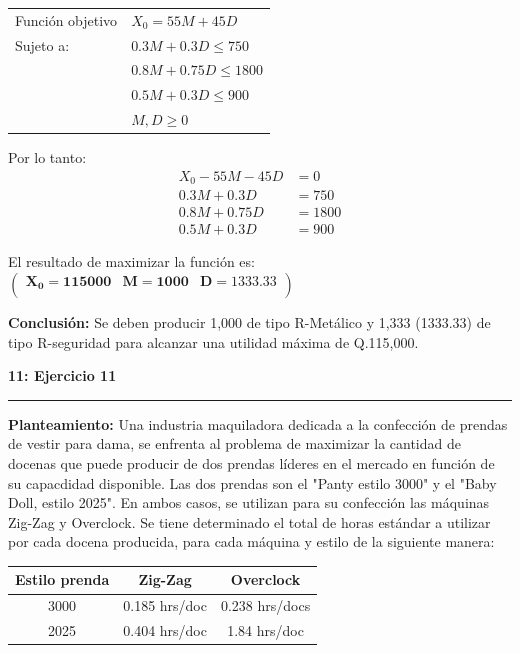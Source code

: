 \documentclass[11pt]{article}
\newcommand\problema[2]{\vspace{.01in}\textbf{#1: #2}\vspace{.5em}\hrule\vspace{.10in}}
\newcommand\planteamiento{\vspace{.10in}\textbf{Planteamiento: }}
\newcommand\conclusion{\vspace{.10in}\textbf{Conclusión: }}
\begin{document}
\begin{table}[h]
\begin{tabular}{ll}
Función objetivo & $X_0 = 55M+45D$    \\
Sujeto a:        & $0.3M + 0.3D \leq 750$ \\
                 & $0.8M + 0.75D \leq 1800$ \\
                 & $0.5M + 0.3D \leq 900$ \\
                 & $M,D \geq 0$    
\end{tabular}
\end{table}

Por lo tanto:
\begin{align*}
X_0 - 55M - 45D &= 0\\
0.3M + 0.3D &= 750\\
0.8M + 0.75D &= 1800\\
0.5M + 0.3D &= 900
\end{align*}

El resultado de maximizar la función es:
\begin{math}
\mathbf{\left(\begin{array}{rrr}X_0=115000&M=1000&D=1333.33\\\end{array}\right)}
\end{math}

\conclusion Se deben producir 1,000 de tipo R-Metálico y 1,333 (1333.33) de tipo R-seguridad para alcanzar una utilidad máxima de Q.115,000.

\pagebreak
\problema{11}{Ejercicio 11}
\planteamiento
Una industria maquiladora dedicada a la confección de prendas de vestir para dama, se enfrenta al problema de maximizar la cantidad de docenas que puede producir de dos prendas líderes en el mercado en función de su capacdidad disponible. Las dos prendas son el "Panty estilo 3000" y el "Baby Doll, estilo 2025". En ambos casos, se utilizan para su confección las máquinas Zig-Zag y Overclock. Se tiene determinado el total de horas estándar a utilizar por cada docena producida, para cada máquina y estilo de la siguiente manera:

\begin{table}[h]
\begin{tabular}{|c|c|c|}
\hline
\textbf{Estilo prenda} & \textbf{Zig-Zag} & \textbf{Overclock} \\ \hline
3000                   & 0.185 hrs/doc    & 0.238 hrs/docs     \\ \hline
2025                   & 0.404 hrs/doc    & 1.84 hrs/doc       \\ \hline
\end{tabular}
\end{table}
\end{document}
